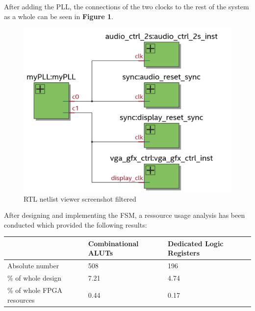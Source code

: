 \documentclass[10pt,a4paper,titlepage,oneside]{article}
\begin{document}
\maketitle




\begin{qa}{After adding the PLL, the connections of the two clocks to the rest of the system as a whole can be seen in \textbf{Figure 1}.}
	\begin{center}
		\begin{figure}[h!]
			\centering
				\includegraphics[width=0.5\linewidth]{pll.png}
			\caption{RTL netlist viewer screenshot filtered}
		\end{figure}
	\end{center}
\end{qa}




\begin{qa}{ After designing and implementing the FSM, a ressource usage analysis has been conducted which provided the following results:}

\centering
\begin{tabular}{l|ll}
	\hline
		                   & Combinational ALUTs & Dedicated Logic Registers  \\ \hline\hline 
	Absolute number            & 508                 & 196                        \\
	\% of whole design         & 7.21                & 4.74                       \\
	\% of whole FPGA resources & 0.44                & 0.17                       \\ \hline
\end{tabular}
\end{qa}
\end{document}
